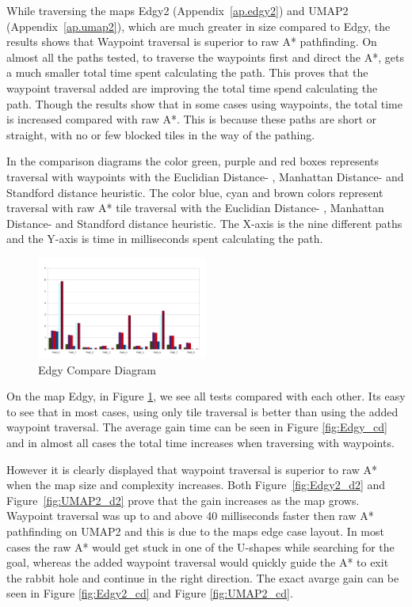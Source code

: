 \documentclass[a4paper]{article}
\begin{document}
While traversing the maps Edgy2 (Appendix~\ref{ap.edgy2}) and UMAP2 (Appendix~\ref{ap.umap2}), which are much greater in size compared to Edgy, the results shows that Waypoint traversal is superior to raw A* pathfinding. On almost all the paths tested, to traverse the waypoints first and direct the A*, gets a much smaller total time spent calculating the path. This proves that the waypoint traversal added are improving the total time spend calculating the path. Though the results show that in some cases using waypoints, the total time is increased compared with raw A*. This is because these paths are short or straight, with no or few blocked tiles in the way of the pathing.
	
In the comparison diagrams the color green, purple and red boxes represents traversal with waypoints with the Euclidian Distance- , Manhattan Distance- and Standford distance heuristic.
The color blue, cyan and brown colors represent traversal with raw A* tile traversal with the Euclidian Distance- , Manhattan Distance- and Standford distance heuristic.
The  X-axis is the nine different paths and the Y-axis is time in milliseconds spent calculating the path.
\begin{figure}[h!]
\centering
\includegraphics[width=0.5\textwidth,height=\textheight,keepaspectratio]{ChartsAndFigures/Edgy_d2.png}
\caption{Edgy Compare Diagram}
\label{fig:Edgy_d2}
\end{figure}	
On the map Edgy, in Figure \ref{fig:Edgy_d2}, we see all tests compared with each other. Its easy to see that in most cases, using only tile traversal is better than using the added waypoint traversal.
The average gain time can be seen in Figure \ref{fig:Edgy_cd} and in almost all cases the total time increases when traversing with waypoints.
	
However it is clearly displayed that waypoint traversal is superior to raw A* when the map size and complexity increases. Both Figure~\ref{fig:Edgy2_d2} and Figure~\ref{fig:UMAP2_d2} prove that the gain increases as the map grows.
Waypoint traversal was up to and above 40 milliseconds faster then raw A* pathfinding on UMAP2 and this is due to the maps edge case layout. In most cases the raw A* would get stuck in one of the U-shapes while searching for the goal, whereas the added waypoint traversal would quickly guide the A* to exit the rabbit hole and continue in the right direction. The exact avarge gain can be seen in Figure \ref{fig:Edgy2_cd} and Figure \ref{fig:UMAP2_cd}.
	
\end{document}
